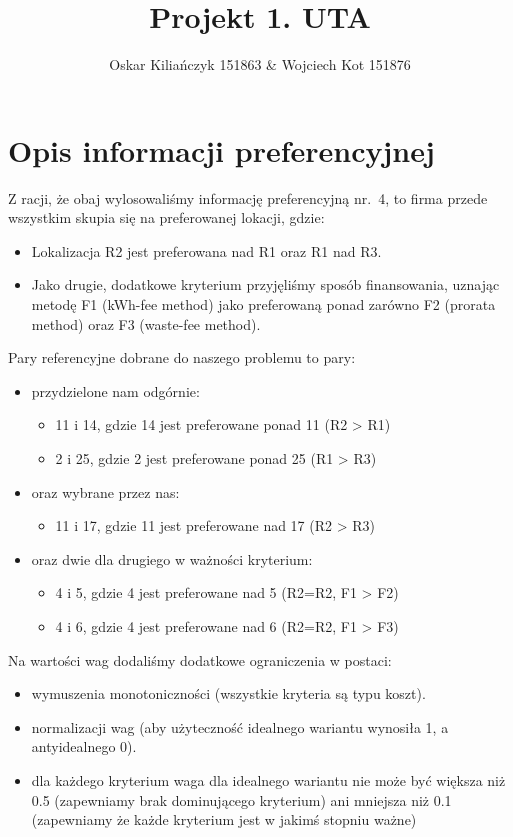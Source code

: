 \documentclass[11pt]{article}
\title{Projekt 1. UTA}
\author{Oskar Kiliańczyk 151863 \& Wojciech Kot 151876}
\date{}
\begin{document}
\maketitle
\newpage

\section{Opis informacji preferencyjnej}\label{sec:opis-informacji-preferencyjnej}

Z racji, że obaj wylosowaliśmy informację preferencyjną nr.\ 4, to firma przede wszystkim skupia się na preferowanej lokacji, gdzie:
\begin{itemize}
\item Lokalizacja R2 jest preferowana nad R1 oraz R1 nad R3.
\item Jako drugie, dodatkowe kryterium przyjęliśmy sposób finansowania, uznając metodę F1 (kWh-fee method) jako preferowaną ponad zarówno F2 (prorata method) oraz F3 (waste-fee method).
\end{itemize}

Pary referencyjne dobrane do naszego problemu to pary:
\begin{itemize}
\item przydzielone nam odgórnie:
\begin{itemize}
\item 11 i 14, gdzie 14 jest preferowane ponad 11 (R2 > R1)
\item 2 i 25, gdzie 2 jest preferowane ponad 25 (R1 > R3)
\end{itemize}
\item oraz wybrane przez nas:
\begin{itemize}
\item 11 i 17, gdzie 11 jest preferowane nad 17 (R2 > R3)
\end{itemize}
\item oraz dwie dla drugiego w ważności kryterium:
\begin{itemize}
\item 4 i 5, gdzie 4 jest preferowane nad 5 (R2=R2, F1 > F2)
\item 4 i 6,  gdzie 4 jest preferowane nad 6 (R2=R2, F1 > F3)
\end{itemize}
\end{itemize}

Na wartości wag dodaliśmy dodatkowe ograniczenia w postaci:
\begin{itemize}
\item wymuszenia monotoniczności (wszystkie kryteria są typu koszt).
\item normalizacji wag (aby użyteczność idealnego wariantu wynosiła 1, a antyidealnego 0).
\item dla każdego kryterium waga dla idealnego wariantu nie może być większa niż 0.5 (zapewniamy brak dominującego kryterium)
ani mniejsza niż 0.1 (zapewniamy że każde kryterium jest w jakimś stopniu ważne)
\end{itemize}
\end{document}

